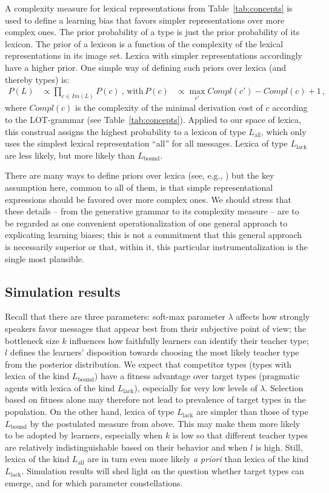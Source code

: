 \documentclass[a4paper, 11pt]{article}
\theoremstyle{Satz}
\newcommand{\mylang}[1]{\ensuremath{L_{\text{#1}}}\xspace} %
\newcommand{\Lall}{\mylang{all}}
\newcommand{\Lbound}{\mylang{bound}}
\newcommand{\Llack}{\mylang{lack}}
\begin{document}
A complexity measure for lexical representations from Table~\ref{tab:concepts} is used to define a
learning bias that favors simpler representations over more complex ones. The prior probability of a
type is just the prior probability of its lexicon. The prior of a lexicon is a function of the
complexity of the lexical representations in its image set. Lexica with simpler representations accordingly have a
higher prior. One simple way of defining such priors over lexica (and thereby types) is:
\begin{align*}
  P(L)  & \propto \prod_{c \in Im(L)} P(c)   \ \text{, with} & 
  P(c) & \propto \max_{c'}Compl(c') - Compl(c) + 1\,,
\end{align*}
where $Compl(c)$ is the complexity of the minimal derivation cost of $c$ according to the
LOT-grammar (see Table~\ref{tab:concepts}). Applied to our space of lexica, this construal assigns the highest probability 
to a lexicon of type $\Lall$, which only uses the simplest lexical representation ``all'' for
all messages. Lexica of type $\Llack$ are less likely, but more likely than $\Lbound$. 

There are many ways to define priors over lexica (see, e.g., \citealt{goodman+etal:2008,
  piantadosi+etal:2012a}) but the key assumption here, common to all of them, is that simple
representational expressions should be favored over more complex ones. We should stress that
these details -- from the generative grammar to its complexity measure -- are to be regarded as
one convenient operationalization of one general approach to explicating learning biases; this
is not a commitment that this general approach is necessarily superior or that, within it, this
particular instrumentalization is the single most plausible.


\subsection{Simulation results}
\label{sec:simulation-results}

Recall that there are three parameters: soft-max parameter $\lambda$ affects how strongly
speakers favor messages that appear best from their subjective point of view; the
bottleneck size $k$ influences how faithfully learners can identify their teacher type; $l$
defines the learners' disposition towards choosing the most likely teacher type from the
posterior distribution. We expect that competitor types (types with lexica of the kind
$\Lbound$) have a fitness advantage over target types (pragmatic agents with lexica of the kind
$\Llack$), especially for very low levels of $\lambda$. Selection based on fitness alone may
therefore not lead to prevalence of target types in the population. On the other hand, lexica
of type $\Llack$ are simpler than those of type $\Lbound$ by the postulated measure from
above. This may make them more likely to be adopted by learners, especially when $k$ is low so
that different teacher types are relatively indistinguishable based on their behavior and when
$l$ is high. Still, lexica of the kind $\Lall$ are in turn even more likely \emph{a priori} than
lexica of the kind $\Llack$. Simulation results will shed light on the question whether target
types can emerge, and for which parameter constellations.
\end{document}
